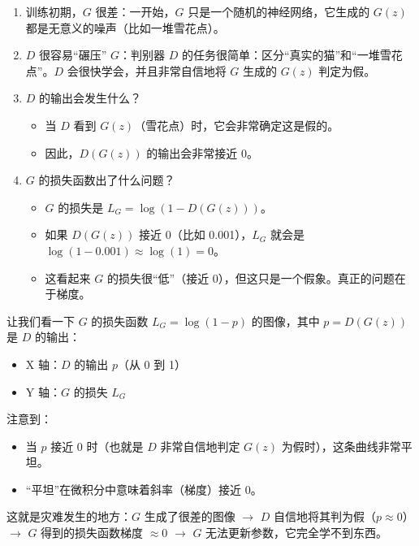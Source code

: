 \begin{enumerate}
\def\labelenumi{\arabic{enumi}.}
\tightlist
\item
  训练初期，\(G\) 很差：一开始，\(G\) 只是一个随机的神经网络，它生成的 \(G(z)\) 都是无意义的噪声（比如一堆雪花点）。
\item
  \(D\) 很容易``碾压'' \(G\)：判别器 \(D\) 的任务很简单：区分``真实的猫''和``一堆雪花点''。\(D\) 会很快学会，并且非常自信地将 \(G\) 生成的 \(G(z)\) 判定为假。
\item
  \(D\) 的输出会发生什么？

  \begin{itemize}
  \tightlist
  \item
    当 \(D\) 看到 \(G(z)\)（雪花点）时，它会非常确定这是假的。
  \item
    因此，\(D(G(z))\) 的输出会非常接近 0。
  \end{itemize}
\item
  \(G\) 的损失函数出了什么问题？

  \begin{itemize}
  \tightlist
  \item
    \(G\) 的损失是 \(L_G=\log(1-D(G(z)))\)。
  \item
    如果 \(D(G(z))\) 接近 0（比如 0.001），\(L_G\) 就会是 \(\log(1-0.001)\approx \log(1)=0\)。
  \item
    这看起来 \(G\) 的损失很``低''（接近 0），但这只是一个假象。真正的问题在于梯度。
  \end{itemize}
\end{enumerate}

让我们看一下 \(G\) 的损失函数 \(L_G=\log(1-p)\) 的图像，其中 \(p=D(G(z))\) 是 \(D\) 的输出：

\begin{itemize}
\tightlist
\item
  X 轴：\(D\) 的输出 \(p\)（从 0 到 1）
\item
  Y 轴：\(G\) 的损失 \(L_G\)
\end{itemize}

注意到：

\begin{itemize}
\tightlist
\item
  当 \(p\) 接近 0 时（也就是 \(D\) 非常自信地判定 \(G(z)\) 为假时），这条曲线非常平坦。
\item
  ``平坦''在微积分中意味着斜率（梯度）接近 0。
\end{itemize}

这就是灾难发生的地方：\(G\) 生成了很差的图像 \(\rightarrow\) \(D\) 自信地将其判为假（\(p\approx 0\)）\(\rightarrow\) \(G\) 得到的损失函数梯度 \(\approx 0\) \(\rightarrow\) \(G\) 无法更新参数，它完全学不到东西。

